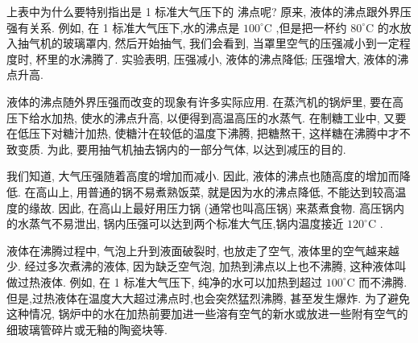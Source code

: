 \documentclass[10pt]{article}
\begin{document}
\begin{center}
\end{center}

上表中为什么要特别指出是 1 标准大气压下的 沸点呢? 原来, 液体的沸点跟外界压强有关系. 例如, 在 1 标准大气压下,水的沸点是 \({100}^{ \circ }\mathrm{C}\) ,但是把一杯约 \({80}^{ \circ }\mathrm{C}\) 的水放入抽气机的玻璃罩内, 然后开始抽气, 我们会看到, 当罩里空气的压强减小到一定程度时, 杯里的水沸腾了. 实验表明, 压强减小, 液体的沸点降低; 压强增大, 液体的沸点升高.

液体的沸点随外界压强而改变的现象有许多实际应用. 在蒸汽机的锅炉里, 要在高压下给水加热, 使水的沸点升高, 以便得到高温高压的水蒸气. 在制糖工业中, 又要在低压下对糖汁加热, 使糖汁在较低的温度下沸腾, 把糖熬干, 这样糖在沸腾中才不致变质. 为此, 要用抽气机抽去锅内的一部分气体, 以达到减压的目的.

我们知道, 大气压强随着高度的增加而减小. 因此, 液体的沸点也随高度的增加而降低. 在高山上, 用普通的锅不易煮熟饭菜, 就是因为水的沸点降低, 不能达到较高温度的缘故. 因此, 在高山上最好用压力锅 (通常也叫高压锅) 来蒸煮食物. 高压锅内的水蒸气不易泄出, 锅内压强可以达到两个标准大气压,锅内温度接近 \({120}^{ \circ }\mathrm{C}\) .

液体在沸腾过程中, 气泡上升到液面破裂时, 也放走了空气, 液体里的空气越来越少. 经过多次煮沸的液体, 因为缺乏空气泡, 加热到沸点以上也不沸腾, 这种液体叫做过热液体. 例如, 在 1 标准大气压下, 纯净的水可以加热到超过 \({100}^{ \circ }\mathrm{C}\) 而不沸腾. 但是,过热液体在温度大大超过沸点时,也会突然猛烈沸腾, 甚至发生爆炸. 为了避免这种情况, 锅炉中的水在加热前要加进一些溶有空气的新水或放进一些附有空气的细玻璃管碎片或无釉的陶瓷块等.
\end{document}

